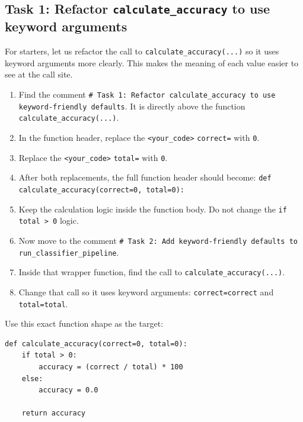 \subsection{Task 1: Refactor \texttt{calculate\_accuracy} to use keyword arguments}
For starters, let us refactor the call to \texttt{calculate\_accuracy(...)} so it uses keyword arguments more clearly. This makes the meaning of each value easier to see at the call site.

\begin{tcolorbox}[title=Task 1: Refactor \texttt{calculate\_accuracy} to use keyword arguments]


\begin{enumerate}
    \item Find the comment \texttt{\# Task 1: Refactor calculate\_accuracy to use keyword-friendly defaults}. It is directly above the function \texttt{calculate\_accuracy(...)}.
    \item In the function header, replace the \texttt{<your\_code>}  \texttt{correct=} with \texttt{0}.
    \item Replace the \texttt{<your\_code>} \texttt{total=} with \texttt{0}.
    \item After both replacements, the full function header should become:
    \texttt{def calculate\_accuracy(correct=0, total=0):}
    \item Keep the calculation logic inside the function body. Do not change the \texttt{if total > 0} logic.
    \item Now move to the comment \texttt{\# Task 2: Add keyword-friendly defaults to \texttt{run\_classifier\_pipeline}}.
    \item Inside that wrapper function, find the call to \texttt{calculate\_accuracy(...)}.
    \item Change that call so it uses keyword arguments:
    \texttt{correct=correct} and \texttt{total=total}.
\end{enumerate}
\end{tcolorbox}

Use this exact function shape as the target:

\begin{verbatim}
def calculate_accuracy(correct=0, total=0):
    if total > 0:
        accuracy = (correct / total) * 100
    else:
        accuracy = 0.0

    return accuracy
\end{verbatim}

